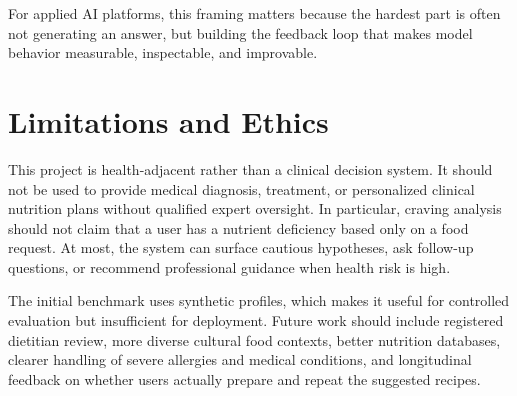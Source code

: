 \documentclass[11pt]{article}
\begin{document}
For applied AI platforms, this framing matters because the hardest part is often not generating an answer, but building the feedback loop that makes model behavior measurable, inspectable, and improvable.

\section{Limitations and Ethics}
This project is health-adjacent rather than a clinical decision system. It should not be used to provide medical diagnosis, treatment, or personalized clinical nutrition plans without qualified expert oversight. In particular, craving analysis should not claim that a user has a nutrient deficiency based only on a food request. At most, the system can surface cautious hypotheses, ask follow-up questions, or recommend professional guidance when health risk is high.

The initial benchmark uses synthetic profiles, which makes it useful for controlled evaluation but insufficient for deployment. Future work should include registered dietitian review, more diverse cultural food contexts, better nutrition databases, clearer handling of severe allergies and medical conditions, and longitudinal feedback on whether users actually prepare and repeat the suggested recipes.



\end{document}
